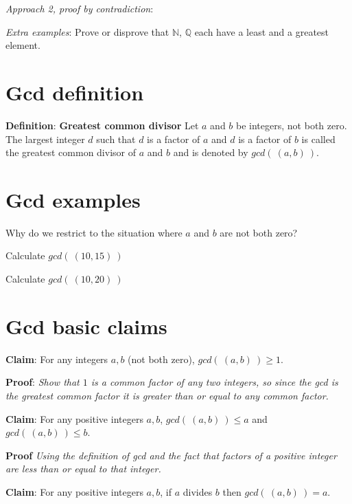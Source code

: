 \documentclass[12pt, oneside]{article}
\begin{document}
{\it Approach 2, proof by contradiction}: 

\vspace{200pt}

{\it Extra examples}: 
Prove or disprove that $\mathbb{N}$,  $\mathbb{Q}$ each have a
least and a greatest element. 
 \vfill
\section*{Gcd definition}


{\bf Definition}: {\bf Greatest common divisor} Let $a$ and $b$ be integers, not both zero. The largest integer $d$ such that 
$d$ is a  factor of $a$ and $d$ is a factor of  $b$ is called the greatest common divisor of $a$ and $b$ 
and is denoted by $gcd(~(a, b)~)$. \vfill
\section*{Gcd examples}


Why do we restrict to the situation where $a$ and $b$ are not both zero?

\vspace{50pt}


Calculate $gcd(~(10,15)~)$

\vspace{50pt}

Calculate $gcd(~(10,20)~)$

\vspace{50pt} \vfill
\section*{Gcd basic claims}


{\bf Claim}: For any integers $a,b$ (not both zero), $gcd(~(a,b)~) \geq 1$.

{\bf Proof}: {\it Show that $1$ is a common factor of any two integers, so since the gcd 
is the greatest common factor it is greater than or equal to any common factor.}

\vspace{150pt}

{\bf Claim}: For any positive integers $a,b$, $gcd(~(a,b)~) \leq a$ and $gcd( ~(a,b)~) \leq b$.

{\bf Proof} {\it Using the definition of gcd and the fact that factors of a positive integer
are less than or equal to that integer.}

\vspace{150pt}

{\bf Claim}: For any positive integers $a,b$, if $a$ divides $b$ then $gcd(~(a,b)~) = a$.
\end{document}

